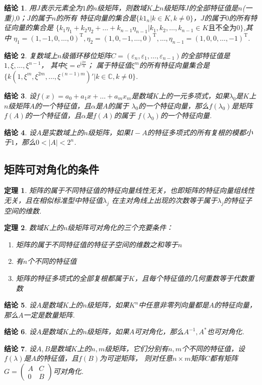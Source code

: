 \documentclass[UTF8]{article}
\newtheorem{thrm}{定理}[subsection]
\newtheorem{ccl}{结论}[subsection]
\begin{document}
\begin{ccl}
  用$J$表示元素全为$1$的$n$级矩阵，则数域$K$上$n$级矩阵$J$的全部特征值是$n$(一重),$0$；$J$的属于$n$的所有
  特征向量的集合是$\{k\textbf{$1_n$}|k\in K,k\ne 0\}$，$J$的属于$0$的所有特征向量的集合是
  $\{k_1\eta_1+k_2\eta_2+\ldots+k_{n-1}\eta_{n-1}|k_1,k_2,\ldots,k_{n-1}\in K\text{且不全为$0$}\}$,其中
  $\eta_1=(1,-1,0,\ldots,0)^{\mathrm{T}},\eta_2=(1,0,-1,\ldots,0)^{\mathrm{T}},\ldots,\eta_{n-1}=(1,0,0,\ldots,-1)^{\mathrm{T}}$.
\end{ccl}
\begin{ccl}
  复数域上$n$级循环移位矩阵$C=(\varepsilon_n,\varepsilon_1,\ldots,\varepsilon_{n-1})$的全部特征值是$1,\xi,\ldots,\xi^{n-1}$，
  其中$\xi=\mathrm{e}^{\mathrm{i}\frac{2\pi}{n}}$；
  属于特征值$\xi^m$的所有特征向量集合是$\{k(1,\xi^m,\xi^{2m},\ldots,\xi^{(n-1)m})'|k\in\mathbb{C},k\ne 0\}$.
\end{ccl}
\begin{ccl}
  设$f(x)=a_0+a_1x+\ldots+a_mx_m$是数域$K$上的一元多项式，如果$\lambda_0$是$K$上$n$级矩阵$A$的一个特征值，且$\alpha$是$A$的属于
  $\lambda_0$的一个特征向量，那么$f(\lambda_0)$是矩阵$f(A)$的一个特征值，且$\alpha$是$f(A)$的属于
  $f(\lambda_0)$的一个特征向量.
\end{ccl}
\begin{ccl}
  设$A$是实数域上的$n$级矩阵，如果$I-A$的特征多项式的所有复根的模都小于$1$，那么$0<|A|<2^n$.
\end{ccl}

\subsection{矩阵可对角化的条件}
\begin{thrm}
  矩阵的属于不同特征值的特征向量线性无关，也即矩阵的特征向量组线性无关，且在相似标准型中特征值$\lambda_j$
  在主对角线上出现的次数等于属于$\lambda_j$的特征子空间的维数.
\end{thrm}
\begin{thrm}
  数域$K$上的$n$级矩阵可对角化的三个充要条件：
  \begin{enumerate}
    \item 矩阵的属于不同特征值的特征子空间的维数之和等于$n$
    \item 有$n$个不同的特征值
    \item 矩阵的特征多项式的全部复根都属于$K$，且每个特征值的几何重数等于代数重数
  \end{enumerate}
\end{thrm}
\begin{ccl}
  设$A$是数域$K$上的$n$级矩阵，如果$K^n$中任意非零列向量都是$A$的特征向量，那么$A$一定是数量矩阵.
\end{ccl}
\begin{ccl}
  设$A$是数域$K$上的$n$级矩阵，如果$A$可对角化，那么$A^{-1},A^{*}$也可对角化.
\end{ccl}
\begin{ccl}
  设$A,B$是数域$K$上的$n,m$级矩阵，它们分别有$n,m$个不同的特征值，设$f(\lambda)$是$A$的特征值，且$f(B)$为可逆矩阵，
  则对任意$n\times m$矩阵$C$都有矩阵$G=\begin{pmatrix} A&C\\0&B \end{pmatrix}$可对角化.
\end{ccl}
\end{document}
